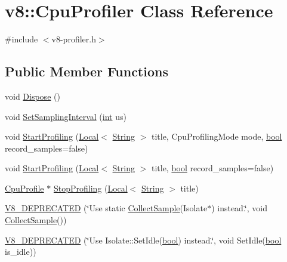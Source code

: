 \hypertarget{classv8_1_1CpuProfiler}{}\section{v8\+:\+:Cpu\+Profiler Class Reference}
\label{classv8_1_1CpuProfiler}


{\ttfamily \#include $<$v8-\/profiler.\+h$>$}

\subsection*{Public Member Functions}
\begin{DoxyCompactItemize}
\item 
void \mbox{\hyperlink{classv8_1_1CpuProfiler_ab49b3f25a897dc6a359571b3014cd225}{Dispose}} ()
\item 
void \mbox{\hyperlink{classv8_1_1CpuProfiler_ac5b05c72fb899e20adfa7f8cc57f21fb}{Set\+Sampling\+Interval}} (\mbox{\hyperlink{classint}{int}} us)
\item 
void \mbox{\hyperlink{classv8_1_1CpuProfiler_a65ff4a18ab14143e094e2ea189facabd}{Start\+Profiling}} (\mbox{\hyperlink{classv8_1_1Local}{Local}}$<$ \mbox{\hyperlink{classv8_1_1String}{String}} $>$ title, Cpu\+Profiling\+Mode mode, \mbox{\hyperlink{classbool}{bool}} record\+\_\+samples=false)
\item 
void \mbox{\hyperlink{classv8_1_1CpuProfiler_a7a9b75d3d7285d90344e1b8f14e97076}{Start\+Profiling}} (\mbox{\hyperlink{classv8_1_1Local}{Local}}$<$ \mbox{\hyperlink{classv8_1_1String}{String}} $>$ title, \mbox{\hyperlink{classbool}{bool}} record\+\_\+samples=false)
\item 
\mbox{\hyperlink{classv8_1_1CpuProfile}{Cpu\+Profile}} $\ast$ \mbox{\hyperlink{classv8_1_1CpuProfiler_aa25e1c2d218e4206311e7dff890c0009}{Stop\+Profiling}} (\mbox{\hyperlink{classv8_1_1Local}{Local}}$<$ \mbox{\hyperlink{classv8_1_1String}{String}} $>$ title)
\item 
\mbox{\hyperlink{classv8_1_1CpuProfiler_a8ddea26e13e631875cb41dcb2563ff40}{V8\+\_\+\+D\+E\+P\+R\+E\+C\+A\+T\+ED}} (\char`\"{}Use static \mbox{\hyperlink{classv8_1_1CpuProfiler_a067e1af52938e37ca4776ead4bfa7847}{Collect\+Sample}}(Isolate$\ast$) instead.\char`\"{}, void \mbox{\hyperlink{classv8_1_1CpuProfiler_a067e1af52938e37ca4776ead4bfa7847}{Collect\+Sample}}())
\item 
\mbox{\hyperlink{classv8_1_1CpuProfiler_aa5a41d80d7d262f2c171a4382f2fbd4f}{V8\+\_\+\+D\+E\+P\+R\+E\+C\+A\+T\+ED}} (\char`\"{}Use Isolate\+::\+Set\+Idle(\mbox{\hyperlink{classbool}{bool}}) instead.\char`\"{}, void Set\+Idle(\mbox{\hyperlink{classbool}{bool}} is\+\_\+idle))
\end{DoxyCompactItemize}

